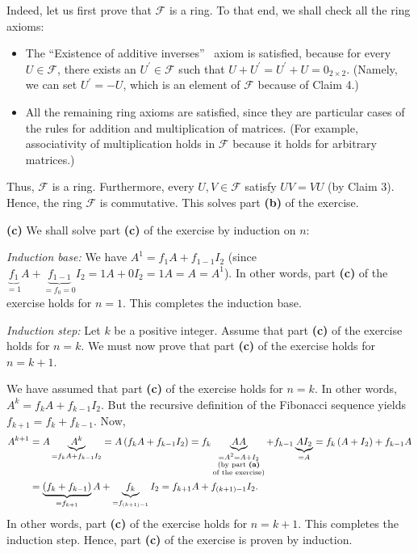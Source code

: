 \documentclass[paper=a4, fontsize=12pt]{scrartcl}%
\theoremstyle{plainsl}
\theoremstyle{definition}
\theoremstyle{remark}
\begin{document}
Indeed, let us first prove that $\mathcal{F}$ is a ring. To that end, we shall
check all the ring axioms:

\begin{itemize}
\item The \textquotedblleft Existence of additive inverses\textquotedblright%
\ axiom is satisfied, because for every $U\in\mathcal{F}$, there exists an
$U^{\prime}\in\mathcal{F}$ such that $U+U^{\prime}=U^{\prime}+U=0_{2\times2}$.
(Namely, we can set $U^{\prime}=-U$, which is an element of $\mathcal{F}$
because of Claim 4.)

\item All the remaining ring axioms are satisfied, since they are particular
cases of the rules for addition and multiplication of matrices. (For example,
associativity of multiplication holds in $\mathcal{F}$ because it holds for
arbitrary matrices.)
\end{itemize}

\noindent Thus, $\mathcal{F}$ is a ring. Furthermore, every $U,V\in
\mathcal{F}$ satisfy $UV=VU$ (by Claim 3). Hence, the ring $\mathcal{F}$ is
commutative. This solves part \textbf{(b)} of the exercise.

\bigskip

\textbf{(c)} We shall solve part \textbf{(c)} of the exercise by induction on
$n$:

\textit{Induction base:} We have $A^{1}=f_{1}A+f_{1-1}I_{2}$ (since
$\underbrace{f_{1}}_{=1}A+\underbrace{f_{1-1}}_{=f_{0}=0}I_{2}=1A+0I_{2}%
=1A=A=A^{1}$). In other words, part \textbf{(c)} of the exercise holds for
$n=1$. This completes the induction base.

\textit{Induction step:} Let $k$ be a positive integer. Assume that part
\textbf{(c)} of the exercise holds for $n=k$. We must now prove that part
\textbf{(c)} of the exercise holds for $n=k+1$.

We have assumed that part \textbf{(c)} of the exercise holds for $n=k$. In
other words, $A^{k}=f_{k}A+f_{k-1}I_{2}$. But the recursive definition of the
Fibonacci sequence yields $f_{k+1}=f_{k}+f_{k-1}$. Now,%
\begin{align*}
A^{k+1}  &  =A\underbrace{A^{k}}_{=f_{k}A+f_{k-1}I_{2}}=A\left(
f_{k}A+f_{k-1}I_{2}\right)  =f_{k}\underbrace{AA}_{\substack{=A^{2}%
=A+I_{2}\\\text{(by part \textbf{(a)}}\\\text{of the exercise)}}%
}+f_{k-1}\underbrace{AI_{2}}_{=A}=f_{k}\left(  A+I_{2}\right)  +f_{k-1}A\\
&  =\underbrace{\left(  f_{k}+f_{k-1}\right)  }_{=f_{k+1}}A+\underbrace{f_{k}%
}_{=f_{\left(  k+1\right)  -1}}I_{2}=f_{k+1}A+f_{\left(  k+1\right)  -1}I_{2}.
\end{align*}
In other words, part \textbf{(c)} of the exercise holds for $n=k+1$. This
completes the induction step. Hence, part \textbf{(c)} of the exercise is
proven by induction.
\end{document}
